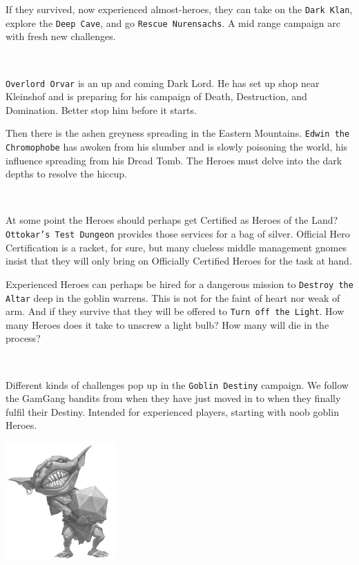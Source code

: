 If they survived, now experienced almost-heroes, they can take on the \texttt{Dark Klan}, explore the \texttt{Deep Cave}, and go \texttt{Rescue Nurensachs}. A mid range campaign arc with fresh new challenges.

\

\noindent
\texttt{Overlord Orvar} is an up and coming Dark Lord. He has set up shop near Kleinshof and is preparing for his campaign of Death, Destruction, and Domination. Better stop him before it starts.

Then there is the ashen greyness spreading in the Eastern Mountains. \texttt{Edwin the Chromophobe} has awoken from his slumber and is slowly poisoning the world, his influence spreading from his Dread Tomb. The Heroes must delve into the dark depths to resolve the hiccup.

\

\noindent
At some point the Heroes should perhaps get Certified as Heroes of the Land? \texttt{Ottokar's Test Dungeon} provides those services for a bag of silver. Official Hero Certification is a racket, for sure, but many clueless middle management gnomes insist that they will only bring on Officially Certified Heroes for the task at hand.

Experienced Heroes can perhaps be hired for a dangerous mission to \texttt{Destroy the Altar} deep in the goblin warrens. This is not for the faint of heart nor weak of arm. And if they survive that they will be offered to \texttt{Turn off the Light}. How many Heroes does it take to unscrew a light bulb? How many will die in the process?

\

\noindent
Different kinds of challenges pop up in the \texttt{Goblin Destiny} campaign. We follow the GamGang bandits from when they have just moved in to when they finally fulfil their Destiny. Intended for experienced players, starting with noob goblin Heroes.


\vfill

\begin{center}
\includegraphics[height=45mm]{./fig/dicegoblin.jpg}
\end{center}







